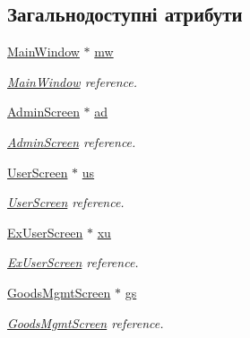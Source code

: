 \subsection*{Загальнодоступні атрибути}
\begin{DoxyCompactItemize}
\item 
\hypertarget{classWindowManager_a9cb795acc230eca8bb2fff11f461fd70}{\hyperlink{classMainWindow}{Main\-Window} $\ast$ \hyperlink{classWindowManager_a9cb795acc230eca8bb2fff11f461fd70}{mw}}\label{classWindowManager_a9cb795acc230eca8bb2fff11f461fd70}

\begin{DoxyCompactList}\small\item\em \hyperlink{classMainWindow}{Main\-Window} reference. \end{DoxyCompactList}\item 
\hypertarget{classWindowManager_ac9607896ec2c594ea376f93a2a8c8e7a}{\hyperlink{classAdminScreen}{Admin\-Screen} $\ast$ \hyperlink{classWindowManager_ac9607896ec2c594ea376f93a2a8c8e7a}{ad}}\label{classWindowManager_ac9607896ec2c594ea376f93a2a8c8e7a}

\begin{DoxyCompactList}\small\item\em \hyperlink{classAdminScreen}{Admin\-Screen} reference. \end{DoxyCompactList}\item 
\hypertarget{classWindowManager_ad6bc24911495de7f8d1e39ae00914475}{\hyperlink{classUserScreen}{User\-Screen} $\ast$ \hyperlink{classWindowManager_ad6bc24911495de7f8d1e39ae00914475}{us}}\label{classWindowManager_ad6bc24911495de7f8d1e39ae00914475}

\begin{DoxyCompactList}\small\item\em \hyperlink{classUserScreen}{User\-Screen} reference. \end{DoxyCompactList}\item 
\hypertarget{classWindowManager_aac54a8f35c47119698b5c52c8d3505b5}{\hyperlink{classExUserScreen}{Ex\-User\-Screen} $\ast$ \hyperlink{classWindowManager_aac54a8f35c47119698b5c52c8d3505b5}{xu}}\label{classWindowManager_aac54a8f35c47119698b5c52c8d3505b5}

\begin{DoxyCompactList}\small\item\em \hyperlink{classExUserScreen}{Ex\-User\-Screen} reference. \end{DoxyCompactList}\item 
\hypertarget{classWindowManager_a5a8f87cbdf8dea57eca5d826de2a1255}{\hyperlink{classGoodsMgmtScreen}{Goods\-Mgmt\-Screen} $\ast$ \hyperlink{classWindowManager_a5a8f87cbdf8dea57eca5d826de2a1255}{gs}}\label{classWindowManager_a5a8f87cbdf8dea57eca5d826de2a1255}

\begin{DoxyCompactList}\small\item\em \hyperlink{classGoodsMgmtScreen}{Goods\-Mgmt\-Screen} reference. \end{DoxyCompactList}\end{DoxyCompactItemize}


